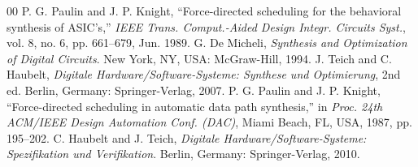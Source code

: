 \documentclass[conference]{IEEEtran}
\begin{document}
\begin{thebibliography}{00}
 P. G. Paulin and J. P. Knight, ``Force-directed scheduling for the behavioral synthesis of ASIC's,'' \textit{IEEE Trans. Comput.-Aided Design Integr. Circuits Syst.}, vol. 8, no. 6, pp. 661--679, Jun. 1989.
 G. De Micheli, \textit{Synthesis and Optimization of Digital Circuits}. New York, NY, USA: McGraw-Hill, 1994.
 J. Teich and C. Haubelt, \textit{Digitale Hardware/Software-Systeme: Synthese und Optimierung}, 2nd ed. Berlin, Germany: Springer-Verlag, 2007.
 P. G. Paulin and J. P. Knight, ``Force-directed scheduling in automatic data path synthesis,'' in \textit{Proc. 24th ACM/IEEE Design Automation Conf. (DAC)}, Miami Beach, FL, USA, 1987, pp. 195--202.
 C. Haubelt and J. Teich, \textit{Digitale Hardware/Software-Systeme: Spezifikation und Verifikation}. Berlin, Germany: Springer-Verlag, 2010.
\end{thebibliography}
\end{document}
